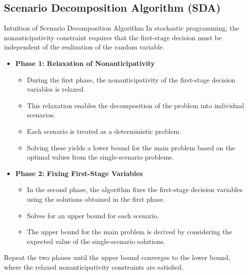 \documentclass[aspectratio=169]{beamer}
\begin{document}
\subsection{Scenario Decomposition Algorithm (SDA)}
\begin{frame}{Intuition of Scenario Decomposition Algorithm}
\small
In stochastic programming, the nonanticipativity constraint requires that the first-stage decision must be independent of the realization of the random variable.
\scriptsize
\begin{itemize}
    \item \textbf{Phase 1: Relaxation of Nonanticipativity}
    \begin{itemize}[label=$\diamond$] 
        \item During the first phase, the nonanticipativity of the first-stage decision variables is relaxed.
        \item This relaxation enables the decomposition of the problem into individual scenarios.
        \item Each scenario is treated as a deterministic problem.
        \item Solving these yields a lower bound for the main problem based on the optimal values from the single-scenario problems.
    \end{itemize}
    \item \textbf{Phase 2: Fixing First-Stage Variables}
    \begin{itemize}[label=$\diamond$] 
        \item In the second phase, the algorithm fixes the first-stage decision variables using the solutions obtained in the first phase.
        \item Solves for an upper bound for each scenario.
        \item The upper bound for the main problem is derived by considering the expected value of the single-scenario solutions.
    \end{itemize}
\end{itemize}
\small
Repeat the two phases until the upper bound converges to the lower bound, where the relaxed nonanticipativity constraints are satisfied.
\end{frame}
\end{document}

